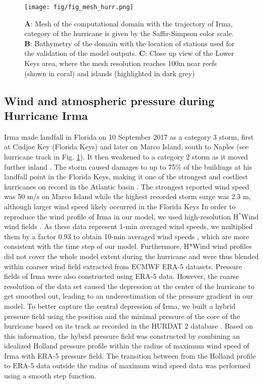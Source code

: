\documentclass[11pt,a4paper]{article}
\begin{document}
\begin{figure}
    \centering
    \texttt{[image: fig/fig\_mesh\_hurr.png]}
    \caption{\textbf{A}: Mesh of the computational domain with the trajectory of Irma, category of the hurricane is given by the Saffir-Simpson color scale. \textbf{B}: Bathymetry of the domain with the location of stations used for the validation of the model outputs. \textbf{C}: Close up view of the Lower Keys area, where the mesh resolution reaches 100m near reefs (shown in coral) and islands (highlighted in dark grey)}
    \label{fig:mesh}
\end{figure}

\subsection{Wind and atmospheric pressure during Hurricane Irma}

Irma made landfall in Florida on 10 September 2017 as a category 3 storm, first at Cudjoe Key (Florida Keys) and later on Marco Island, south to Naples (see hurricane track in Fig. \ref{fig:mesh}). It then weakened to a category 2 storm as it moved further inland \citep{pinelli2018overview}. The storm caused damages to up to 75\% of the buildings at his landfall point in the Florida Keys, making it one of the strongest and costliest hurricanes on record in the Atlantic basin \citep{xian2018brief,zhang2019modeling}. The strongest reported wind speed was 50 m/s on Marco Island while the highest recorded storm surge was 2.3 m, although larger wind speed likely occurred in the Florida Keys \citep{pinelli2018overview}
In order to reproduce the wind profile of Irma in our model, we used high-resolution H$^\ast$Wind wind fields \citep{powell1998hrd}. As these data represent 1-min averaged wind speeds, we multiplied them by a factor 0.93 to obtain 10-min averaged wind speeds \citep{harper2010guidelines}, which are more consistent with the time step of our model. Furthermore, H*Wind wind profiles did not cover the whole model extent during the hurricane and were thus blended within coarser wind field extracted from ECMWF ERA-5 datasets. Pressure fields of Irma were also constructed using ERA-5 data. However, the coarse resolution of the data set caused the depression at the center of the hurricane to get smoothed out, leading to an underestimation of the pressure gradient in our model. To better capture the central depression of Irma, we built a hybrid pressure field using the position and the minimal pressure of the core of the hurricane based on its track as recorded in the HURDAT 2 database \citep{landsea2013atlantic}. Based on this information, the hybrid pressure field was constructed by combining an idealized Holland pressure profile \citep{lin2012hurricane} within the radius of maximum wind speed of Irma \citep{knaff2018statistical} with ERA-5 pressure field. The transition between from the Holland profile to ERA-5 data outside the radius of maximum wind speed data was performed using a smooth step function.
\end{document}
